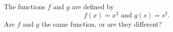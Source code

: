 The functions $f$ and $g$ are defined by
\begin{equation*}
    f(x) = x^2 \text{ and } g(s) = s^2.
\end{equation*}
Are $f$ and $g$ the same function, or are they different?
